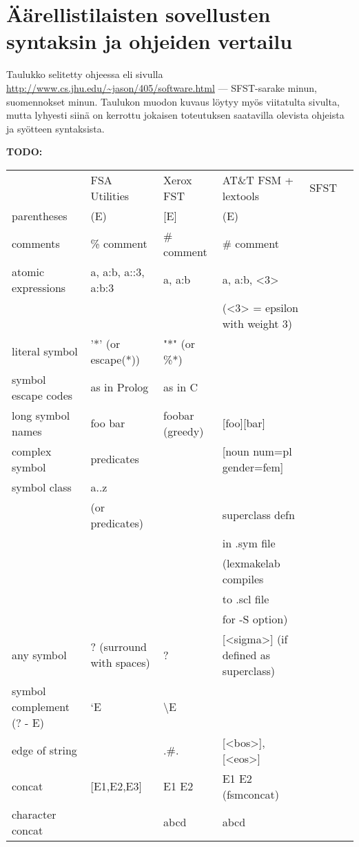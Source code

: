 \documentclass[free]{flammie}
\begin{document}
\section{Äärellistilaisten sovellusten syntaksin ja ohjeiden vertailu}

Taulukko selitetty ohjeessa \cite{eisner2007} eli sivulla
\url{http://www.cs.jhu.edu/~jason/405/software.html} — SFST-sarake minun,
suomennokset minun. Taulukon muodon kuvaus löytyy myös viitatulta sivulta, mutta
lyhyesti siinä on kerrottu jokaisen toteutuksen saatavilla olevista ohjeista ja
syötteen syntaksista.

\begin{table}
    \bf TODO:
    \begin{tabular}{|l|l|l|l|l|l|}
        \hline
        & FSA Utilities & Xerox FST & AT\&T FSM + lextools & SFST \\
        parentheses	& (E) & [E] & (E) & \\
        comments & \% comment & \# comment & \# comment\\
\hline
atomic expressions & a, a:b, a::3, a:b:3 & a, a:b & a, a:b, <3>\\
        &&&(<3> = epsilon with weight 3)\\
\hline
literal symbol & '*' (or escape(*)) & "*" (or \%*) & \*\\
\hline
symbol escape codes & as in Prolog & as in C &  \\
\hline
long symbol names & foo bar & foobar (greedy) & [foo][bar]\\
\hline
complex symbol & predicates &   & [noun num=pl gender=fem]\\
\hline
symbol class & a..z\\
        & (or predicates) &   & superclass defn\\
        &&&in .sym file\\
        &&&(lexmakelab compiles\\
        &&&to .scl file\\
        &&&for -S option)\\
\hline
any symbol & ? (surround with spaces) & ? & [<sigma>] (if defined as superclass)\\
\hline
symbol complement (? - E) & `E & \textbackslash E &  \\
\hline
edge of string &   & .\#. & [<bos>], [<eos>]\\
\hline
concat & [E1,E2,E3] & E1 E2 & E1 E2 (fsmconcat)\\
\hline
character concat &   & {abcd} & abcd\\

\end{tabular}
\end{table}
\end{document}
